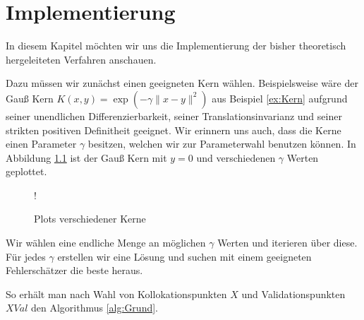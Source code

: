 \chapter{Implementierung}
\label{cha:Implementierung}

In diesem Kapitel möchten wir uns die Implementierung der bisher theoretisch hergeleiteten Verfahren anschauen.

Dazu müssen wir zunächst einen geeigneten Kern wählen. Beispielsweise wäre der Gauß Kern $K(x,y) = \exp\left(-\gamma \|x-y\|^2\right)$ aus Beispiel \ref{ex:Kern} aufgrund seiner unendlichen Differenzierbarkeit, seiner Translationsinvarianz und seiner strikten positiven Definitheit geeignet. Wir erinnern uns auch, dass die Kerne einen Parameter $\gamma$ besitzen, welchen wir zur Parameterwahl benutzen können. In Abbildung \ref{fig:Kerne} ist der Gauß Kern mit $y= 0$ und verschiedenen $\gamma$ Werten geplottet.
\begin{figure}[ht]
\centering
\resizebox {.8\columnwidth} {!} {

}
\caption{Plots verschiedener Kerne}
\label{fig:Kerne}
\end{figure}
Wir wählen eine endliche Menge an möglichen $\gamma$ Werten und iterieren über diese. Für jedes $\gamma$ erstellen wir eine Lösung und suchen mit einem geeigneten Fehlerschätzer die beste heraus.

So erhält man nach Wahl von Kollokationspunkten $X$ und Validationspunkten $XVal$ den Algorithmus \ref{alg:Grund}.


